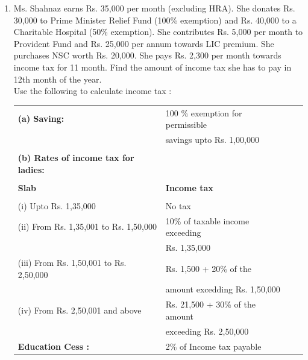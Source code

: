 \documentclass[journal,12pt,twocolumn]{IEEEtran}
\renewcommand\thesection{\arabic{section}}
\begin{document}
\begin{enumerate}[label=\thesection.\arabic*.,ref=\thesection.\theenumi]
\item Ms. Shahnaz earns Rs. 35,000 per month (excluding HRA). She donates Rs. 30,000 to Prime Minister Relief Fund (100\% exemption) and Rs. 40,000 to a Charitable Hospital (50\% exemption). She contributes Rs. 5,000 per month to Provident Fund and Rs. 25,000 per annum towards LIC premium. She purchases NSC worth Rs. 20,000. She pays Rs. 2,300 per month towards income tax for 11 month. Find the amount of income tax she has to pay in 12th month of the year.\\
Use the following to calculate income tax :
\begin{table}[ht]
    \begin{tabular}{l l c c}
    \textbf{(a) Saving:} & 100 \% exemption for permissible \\ & savings  upto Rs. 1,00,000 \\ \\
    \textbf{(b) Rates of income tax for ladies:} &\\ \\
    \textbf{Slab} & \textbf{Income tax} \\ \\
    (i) Upto Rs. 1,35,000 & No tax \\ 
    (ii) From Rs. 1,35,001 to Rs. 1,50,000 & 10\% of taxable income exceeding \\& Rs. 1,35,000 \\ 
    (iii) From Rs. 1,50,001 to Rs. 2,50,000 & Rs. 1,500 + 20\% of the \\& amount excedding Rs. 1,50,000 \\
    (iv) From Rs. 2,50,001 and above & Rs. 21,500 + 30\% of the amount \\& exceeding Rs. 2,50,000 \\
    \textbf{Education Cess :} & 2\% of Income tax payable
    \end{tabular}
\end{table}
\end{enumerate}
\end{document}
